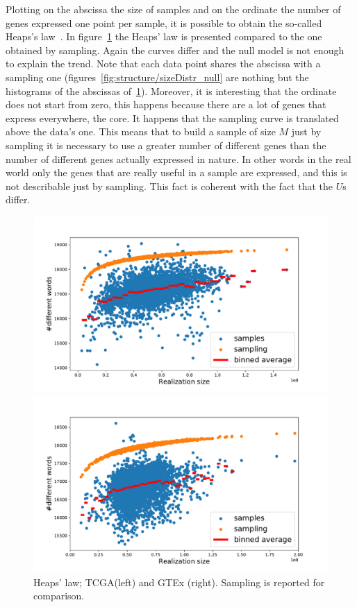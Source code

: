 Plotting on the abscissa the size of samples and on the ordinate the number of genes expressed one point per sample, it is possible to obtain the so-called Heaps's law~\cite{Heaps:1978:IRC:539986}. In figure~\ref{fig:structure/heaps_null} the Heaps' law is presented compared to the one obtained by sampling. Again the curves differ and the null model is not enough to explain the trend. Note that each data point shares the abscissa with a sampling one (figures~\ref{fig:structure/sizeDistr_null} are nothing but the histograms of the abscissas of~\ref{fig:structure/heaps_null}). Moreover, it is interesting that the ordinate does not start from zero, this happens because there are a lot of genes that express everywhere, the core. It happens that the sampling curve is translated above the data's one. This means that to build a sample of size $M$ just by sampling it is necessary to use a greater number of different genes than the number of different genes actually expressed in nature. In other words in the real world only the genes that are really useful in a sample are expressed, and this is not describable just by sampling. This fact is coherent with the fact that the $U$s differ.
\begin{figure}[htb!]
\begin{minipage}{0.5\textwidth}
    \centering
    \includegraphics[width=0.95\linewidth]{pictures/structure/tcga/heaps_null.pdf}
    \end{minipage}
\hspace{2mm}
\begin{minipage}{0.5\textwidth}
    \centering
    \includegraphics[width=0.95\linewidth]{pictures/structure/gtex/heaps_null.pdf}
    \end{minipage}
\caption{Heaps' law; TCGA(left) and GTEx (right). Sampling is reported for comparison.}
\label{fig:structure/heaps_null}
\end{figure}
